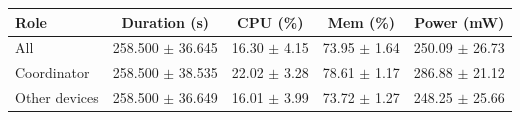 \begin{tabular}{lcccc}
\hline
\textbf{Role} & \textbf{Duration (s)} & \textbf{CPU (\%)} & \textbf{Mem (\%)} & \textbf{Power (mW)} \\
\hline
All & 258.500 $\pm$ 36.645 & 16.30 $\pm$ 4.15 & 73.95 $\pm$ 1.64 & 250.09 $\pm$ 26.73 \\
Coordinator & 258.500 $\pm$ 38.535 & 22.02 $\pm$ 3.28 & 78.61 $\pm$ 1.17 & 286.88 $\pm$ 21.12 \\
Other devices & 258.500 $\pm$ 36.649 & 16.01 $\pm$ 3.99 & 73.72 $\pm$ 1.27 & 248.25 $\pm$ 25.66 \\
\hline
\end{tabular}
